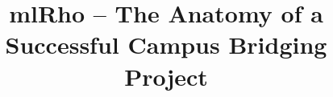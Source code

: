 \documentclass{sig-alternate}
\begin{document}
%

\title{mlRho -- The Anatomy of a Successful Campus Bridging Project}
%
%
%
%
%
\end{document}
